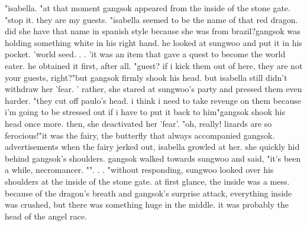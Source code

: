 "isabella.
"at that moment gangsok appeared from the inside of the stone gate.
"stop it.
 they are my guests.
"isabella seemed to be the name of that red dragon.
 did she have that name in spanish style because she was from brazil?gangsok was holding something white in his right hand.
 he looked at sungwoo and put it in his pocket.
'world seed.
.
.
'it was an item that gave a quest to become the world eater.
 he obtained it first, after all.
 "guest? if i kick them out of here, they are not your guests, right?"but gangsok firmly shook his head.
 but isabella still didn't withdraw her 'fear.
' rather, she stared at sungwoo's party and pressed them even harder.
"they cut off paulo's head.
 i think i need to take revenge on them because i'm going to be stressed out if i have to put it back to him"gangsok shook his head once more.
 then, she deactivated her 'fear'.
"oh, really! lizards are so ferocious!"it was the fairy, the butterfly that always accompanied gangsok.
 advertisements    when the fairy jerked out, isabella growled at her.
 she quickly hid behind gangsok's shoulders.
gangsok walked towards sungwoo and said, "it's been a while, necromancer.
"".
.
.
"without responding, sungwoo looked over his shoulders at the inside of the stone gate.
at first glance, the inside was a mess.
 because of the dragon's breath and gangsok's surprise attack, everything inside was crushed, but there was something huge in the middle.
 it was probably the head of the angel race.


 